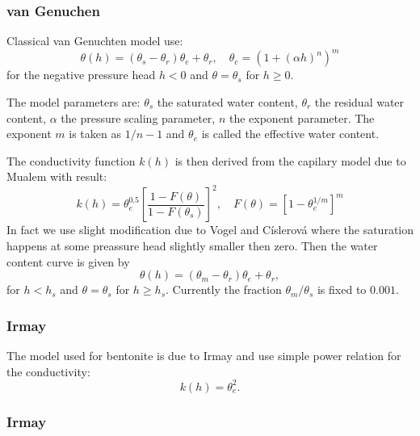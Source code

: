 \subsubsection{van Genuchen}
Classical van Genuchten model use:
\[
    \theta(h) = (\theta_s-\theta_r)\theta_e + \theta_r,\quad \theta_e = (1+ (\alpha h)^n)^m
\]
for the negative pressure head $h<0$ and $\theta = \theta_s$ for $h\ge 0$.

The model parameters are:
    $\theta_s$ \units{}{}{} the saturated water content,
    $\theta_r$ \units{}{}{} the residual water content,
    $\alpha$  the pressure scaling parameter,
    $n$ \units{}{}{} the exponent parameter.
The exponent $m$ is taken as $1/n-1$ and $\theta_e$ \units{}{}{} is called the effective water content.

The conductivity function $k(h)$ is then derived from the capilary model due to Mualem with result:
\[
    k(h) = \theta_e^{0.5} \left[ \frac{1-F(\theta)}{1-F(\theta_s)} \right]^2,\quad F(\theta)= \left[ 1- \theta_e^{1/m} \right]^m
\]
In fact we use slight modification due to Vogel and Císlerová where the saturation happens at some preassure head slightly smaller then zero.
Then the water content curve is given by 
\[
    \theta(h) = (\theta_m-\theta_r)\theta_e + \theta_r,
\]
for $h< h_s$ and $\theta = \theta_s$ for $h\ge h_s$. Currently the fraction $\theta_m / \theta_s$ is fixed to $0.001$.

\subsubsection{Irmay}
The model used for bentonite is due to Irmay and use simple power relation for the conductivity:
\[
   k(h) = \theta_e^{2}.
\]



    

\subsubsection{Irmay}






